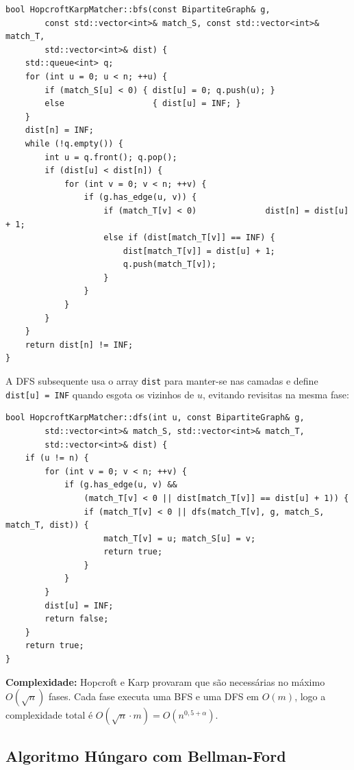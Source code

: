 \documentclass{infufrgs}
\begin{document}
\begin{lstlisting}[caption={Fase BFS de construção da rede em camadas (HopcroftKarpMatcher.cpp)}]
bool HopcroftKarpMatcher::bfs(const BipartiteGraph& g,
        const std::vector<int>& match_S, const std::vector<int>& match_T,
        std::vector<int>& dist) {
    std::queue<int> q;
    for (int u = 0; u < n; ++u) {
        if (match_S[u] < 0) { dist[u] = 0; q.push(u); }
        else                  { dist[u] = INF; }
    }
    dist[n] = INF;
    while (!q.empty()) {
        int u = q.front(); q.pop();
        if (dist[u] < dist[n]) {
            for (int v = 0; v < n; ++v) {
                if (g.has_edge(u, v)) {
                    if (match_T[v] < 0)              dist[n] = dist[u] + 1;
                    else if (dist[match_T[v]] == INF) {
                        dist[match_T[v]] = dist[u] + 1;
                        q.push(match_T[v]);
                    }
                }
            }
        }
    }
    return dist[n] != INF;
}
\end{lstlisting}

A DFS subsequente usa o array \texttt{dist} para manter-se nas camadas e define \texttt{dist[u] = INF} quando esgota os vizinhos de $u$, evitando revisitas na mesma fase:

\begin{lstlisting}[caption={Fase DFS de aumento em camadas (HopcroftKarpMatcher.cpp)}]
bool HopcroftKarpMatcher::dfs(int u, const BipartiteGraph& g,
        std::vector<int>& match_S, std::vector<int>& match_T,
        std::vector<int>& dist) {
    if (u != n) {
        for (int v = 0; v < n; ++v) {
            if (g.has_edge(u, v) &&
                (match_T[v] < 0 || dist[match_T[v]] == dist[u] + 1)) {
                if (match_T[v] < 0 || dfs(match_T[v], g, match_S, match_T, dist)) {
                    match_T[v] = u; match_S[u] = v;
                    return true;
                }
            }
        }
        dist[u] = INF;
        return false;
    }
    return true;
}
\end{lstlisting}

\textbf{Complexidade:} Hopcroft e Karp provaram que são necessárias no máximo $O(\sqrt{n})$ fases. Cada fase executa uma BFS e uma DFS em $O(m)$, logo a complexidade total é $O(\sqrt{n} \cdot m) = O(n^{0{,}5+\alpha})$.

\subsection{Algoritmo Húngaro com Bellman-Ford}
\end{document}
